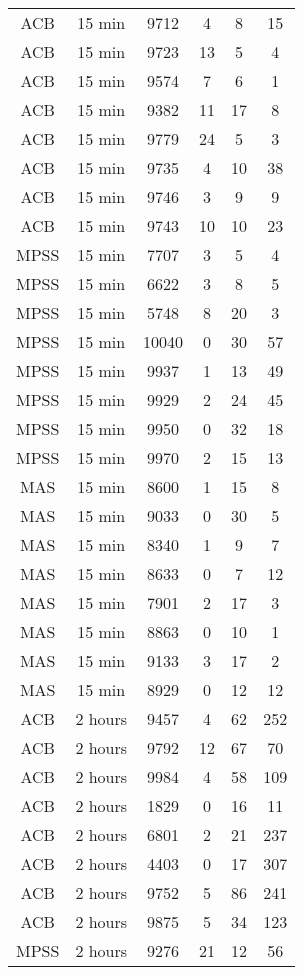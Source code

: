 \begin{center}
\begin{longtable}{cccccc}
\hline \hline
\endlastfoot
ACB  	&	15 min	&	9712	&	4	&	8	&	15	\\
ACB   	&	15 min	&	9723	&	13	&	5	&	4	\\
ACB	    &	15 min	&	9574	&	7	&	6	&	1	\\
ACB  	&	15 min	&	9382	&	11	&	17	&	8	\\
ACB   	&	15 min	&	9779	&	24	&	5	&	3	\\
ACB	    &	15 min	&	9735	&	4	&	10	&	38	\\
ACB	    &	15 min	&	9746	&	3	&	9	&	9	\\
ACB	    &	15 min	&	9743	&	10	&	10	&	23	\\
MPSS	&	15 min	&	7707	&	3	&	5	&	4	\\
MPSS	&	15 min	&	6622	&	3	&	8	&	5	\\
MPSS	&	15 min	&	5748	&	8	&	20	&	3	\\
MPSS	&	15 min	&	10040	&	0	&	30	&	57	\\
MPSS	&	15 min	&	9937	&	1	&	13	&	49	\\
MPSS	&	15 min	&	9929	&	2	&	24	&	45	\\
MPSS	&	15 min	&	9950	&	0	&	32	&	18	\\
MPSS	&	15 min	&	9970	&	2	&	15	&	13	\\
MAS	&	15 min	&	8600	&	1	&	15	&	8	\\
MAS	&	15 min	&	9033	&	0	&	30	&	5	\\
MAS	&	15 min	&	8340	&	1	&	9	&	7	\\
MAS	&	15 min	&	8633	&	0	&	7	&	12	\\
MAS	&	15 min	&	7901	&	2	&	17	&	3	\\
MAS	&	15 min	&	8863	&	0	&	10	&	1	\\
MAS	&	15 min	&	9133	&	3	&	17	&	2	\\
MAS	&	15 min	&	8929	&	0	&	12	&	12	\\
ACB	&	2 hours	&	9457	&	4	&	62	&	252	\\
ACB	&	2 hours	&	9792	&	12	&	67	&	70	\\
ACB	&	2 hours	&	9984	&	4	&	58	&	109	\\
ACB	&	2 hours	&	1829	&	0	&	16	&	11	\\
ACB	&	2 hours	&	6801	&	2	&	21	&	237	\\
ACB	&	2 hours	&	4403	&	0	&	17	&	307	\\
ACB	&	2 hours	&	9752	&	5	&	86	&	241	\\
ACB	&	2 hours	&	9875	&	5	&	34	&	123	\\
MPSS	&	2 hours	&	9276	&	21	&	12	&	56	\\

\end{longtable}
\end{center}
